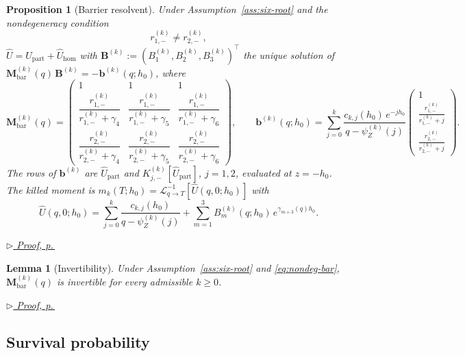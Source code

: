 \documentclass[11pt]{article}
\newcommand{\proofref}[1]{%
  \par\noindent\hfill{\small\itshape\hyperref[#1]{$\triangleright$ Proof, p.\,\pageref{#1}}}}
\theoremstyle{plain}
\newtheorem{lemma}[theorem]{Lemma}
\newtheorem{proposition}[theorem]{Proposition}
\theoremstyle{definition}
\theoremstyle{remark}
\begin{document}
\begin{proposition}[Barrier resolvent]\label{prop:Ubar}
Under Assumption~\ref{ass:six-root} and the nondegeneracy condition
\begin{equation}\label{eq:nondeg-bar}
r_{1,-}^{(k)}\neq r_{2,-}^{(k)},
\end{equation}
$\widehat U=\widehat U_{\mathrm{part}}+\widehat U_{\mathrm{hom}}$ with
$\mathbf{B}^{(k)}:=(B_1^{(k)},B_2^{(k)},B_3^{(k)})^\top$ the unique solution of
$\mathbf{M}_{\mathrm{bar}}^{(k)}(q)\,\mathbf{B}^{(k)}=-\mathbf{b}^{(k)}(q;h_0)$, where
\[
\mathbf{M}_{\mathrm{bar}}^{(k)}(q)=
\begin{pmatrix}
1 & 1 & 1\\[4pt]
\dfrac{r_{1,-}^{(k)}}{r_{1,-}^{(k)}+\gamma_4} &
\dfrac{r_{1,-}^{(k)}}{r_{1,-}^{(k)}+\gamma_5} &
\dfrac{r_{1,-}^{(k)}}{r_{1,-}^{(k)}+\gamma_6}\\[10pt]
\dfrac{r_{2,-}^{(k)}}{r_{2,-}^{(k)}+\gamma_4} &
\dfrac{r_{2,-}^{(k)}}{r_{2,-}^{(k)}+\gamma_5} &
\dfrac{r_{2,-}^{(k)}}{r_{2,-}^{(k)}+\gamma_6}
\end{pmatrix},
\qquad
\mathbf{b}^{(k)}(q;h_0)
=
\sum_{j=0}^{k}\frac{c_{k,j}(h_0)\,e^{-jh_0}}{q-\psi_Z^{(k)}(j)}
\begin{pmatrix}
1\\[2pt]
\frac{r_{1,-}^{(k)}}{r_{1,-}^{(k)}+j}\\[4pt]
\frac{r_{2,-}^{(k)}}{r_{2,-}^{(k)}+j}
\end{pmatrix}.
\]
The rows of $\mathbf{b}^{(k)}$ are $\widehat U_{\mathrm{part}}$ and
$K_{j,-}^{(k)}[\widehat U_{\mathrm{part}}]$, $j=1,2$, evaluated at $z=-h_0$. The killed moment is
$m_k(T;h_0)=\mathcal{L}^{-1}_{q\to T}[\widehat{U}(q,0;h_0)]$ with
\begin{equation}\label{eq:Uhat-zero}
\widehat{U}(q,0;h_0)
=
\sum_{j=0}^{k}\frac{c_{k,j}(h_0)}{q-\psi_Z^{(k)}(j)}
+
\sum_{m=1}^{3}B_m^{(k)}(q;h_0)\,e^{\gamma_{m+3}(q)h_0}.
\end{equation}
\end{proposition}
\proofref{proof:prop:Ubar}

\begin{lemma}[Invertibility]\label{lem:Mbar-inv}
Under Assumption~\ref{ass:six-root} and \eqref{eq:nondeg-bar}, $\mathbf{M}_{\mathrm{bar}}^{(k)}(q)$
is invertible for every admissible $k\ge0$.
\end{lemma}
\proofref{proof:lem:Mbar-inv}

\subsection{Survival probability}\label{sec:liquidation}
\end{document}
